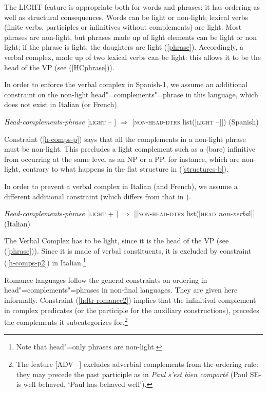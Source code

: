 \documentclass[output=paper]{langsci/langscibook}
\begin{document}
	
	The LIGHT feature is appropriate both for words and phrases; it has ordering as well as structural consequences. Words can be light or non-light; lexical verbs (finite verbs, participles or infinitives without complements) are light. Most phrases are non-light, but phrases made up of light elements can be light or non light; if the phrase is light, the daughters are light (\ref{phrase}). Accordingly, a verbal complex, made up of two lexical verbs can be light: this allows it to be the head of the VP (see (\ref{HCphrase})).
	
	In order to enforce the verbal complex in Spanish-1, we assume an additional constraint on the non-light head"=complements"=phrase in this language, which does not exist in Italian (or French).
	
	

	
	
	\begin{exe}
		\ex \label{h-comps-p}
		\textit{Head-complements-phrase} [\textsc{light} -- ] $\Rightarrow$ \textsc{[non-head-dtrs} list([\textsc{light} --]]) (Spanish)
	\end{exe}


	Constraint (\ref{h-comps-p}) says that all the complements in a non-light phrase must be non-light. This precludes a light complement such as a (bare) infinitive from occurring at the same level as an NP or a PP, for instance, which are non-light, contrary to what happens in the flat structure in  (\ref{structures-b}). 
	
	In order to prevent a verbal complex in Italian (and French), we assume a different additional constraint (which differs from that in \cite{AG2005}).
	
	
	
	\begin{exe}
		\ex \label{h-comps-p2}
		\textit{Head-complements-phrase} [\textsc{light} + ] $\Rightarrow$ [\textsc{[non-head-dtrs} list([\textsc{head} \textit{non-verba}l]] (Italian)
	\end{exe}
	
	

	
	The Verbal Complex has to be light, since it is the head of the VP (see (\ref{phrase})). Since it is made of verbal constituents, it is excluded by constraint (\ref{h-comps-p2}) in Italian.\footnote{Note that head"=only phrases are non-light.}
	
	Romance languages follow the general constraints on ordering in head"=complements"=phrases in non-final languages. They are given here informally. Constraint (\ref{hdtr-romance2}) implies that the infinitival complement in complex predicates (or the participle for the auxiliary constructions), precedes the complements it subcategorizes for.\footnote{The feature [ADV --] excludes adverbial complements from the ordering rule: they may precede the past participle as in \textit{Paul s’est bien comporté}  (Paul SE-is well behaved, ‘Paul has behaved well’).} 
	
\end{document}
